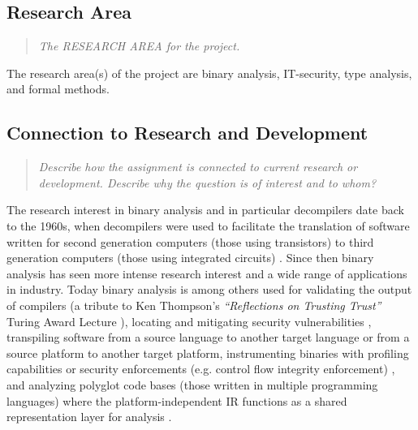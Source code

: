\documentclass[12pt, a4paper]{article}
\begin{document}

\subsection{Research Area}

\begin{quote}
	\textit{The RESEARCH AREA for the project.}
\end{quote}

The research area(s) of the project are binary analysis, IT-security, type analysis, and formal methods.

\subsection{Connection to Research and Development}
\label{sec:connection_to_research_and_development}

\begin{quote}
	\textit{Describe how the assignment is connected to current research or development. Describe why the question is of interest and to whom?}
\end{quote}

The research interest in binary analysis and in particular decompilers date back to the 1960s, when decompilers were used to facilitate the translation of software written for second generation computers (those using transistors) to third generation computers (those using integrated circuits) \cite{reverse_compilation}. Since then binary analysis has seen more intense research interest and a wide range of applications in industry. Today binary analysis is among others used for validating the output of compilers (a tribute to Ken Thompson's \textit{``Reflections on Trusting Trust''} Turing Award Lecture \cite{trusting_trust}), locating and mitigating security vulnerabilities \cite{state_of_the_art_of_war}, transpiling software from a source language to another target language or from a source platform to another target platform, instrumenting binaries with profiling capabilities or security enforcements (e.g. control flow integrity enforcement) \cite{superset_disassembly}, and analyzing polyglot code bases (those written in multiple programming languages) where the platform-independent IR functions as a shared representation layer for analysis \cite{revgen}.
\end{document}
